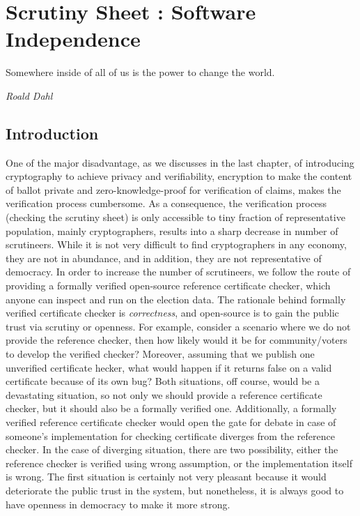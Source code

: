 \chapter{Scrutiny Sheet : Software Independence}
\label{cha:software_independence}

\epigraph{Somewhere inside of all of us is the power to change the world.} 
{\textit{Roald Dahl }}

\section{Introduction}


One of the major disadvantage, as we discusses in the last chapter, of introducing cryptography 
to achieve privacy and verifiability, encryption to make the 
content of ballot private and zero-knowledge-proof for verification of claims, makes the verification 
process cumbersome. As a consequence, the verification process (checking the scrutiny sheet) is only accessible 
to tiny fraction of representative population, mainly cryptographers, results into a sharp decrease in number of scrutineers. 
While it is not very difficult to find cryptographers in any economy, 
they are not in abundance, and in addition, they are not representative of democracy. 
In order to increase the number of scrutineers, we follow the route of providing a formally verified open-source 
reference certificate checker, which anyone can inspect and run on the election data. 
  The rationale behind formally verified certificate checker is \emph{correctness}, 
  and open-source is to gain the public trust  via scrutiny or openness.  
  For example, consider a scenario where we do not provide the reference checker,
  then how 
  likely would it be for community/voters to develop the 
  verified checker? Moreover, assuming that we publish one unverified certificate hecker,
  what would happen if it returns false on a valid certificate because of its own bug? 
  Both situations, off course, would be a devastating situation, so not only we 
  should provide a reference certificate checker, but it should also be a formally verified one. 
  Additionally, a formally verified reference certificate checker would open the gate for
  debate in case of someone's implementation for checking certificate diverges from the reference checker.  
In the case of diverging situation, there are two possibility, either the reference checker is verified 
using wrong assumption,  or the implementation itself is wrong.  The first situation is certainly 
not very pleasant because it would deteriorate the public trust in the system, but nonetheless, it is always
good to  have openness in democracy to make it more strong. 
  
